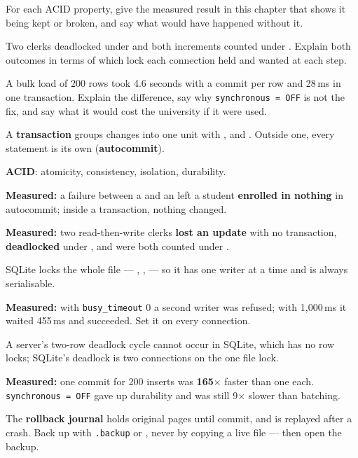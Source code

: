 \begin{checkpoint}
\begin{tightnum}
  \item For each ACID property, give the measured result in this chapter that
        shows it being kept or broken, and say what would have happened
        without it.
  \item Two clerks deadlocked under  and both increments
        counted under . Explain both outcomes in terms of
        which lock each connection held and wanted at each step.
  \item A bulk load of 200 rows took 4.6 seconds with a commit per row and
        28\,ms in one transaction. Explain the difference, say why
        \texttt{synchronous = OFF} is not the fix, and say what it would cost
        the university if it were used.
\end{tightnum}
\end{checkpoint}

\begin{chaptersummary}
\begin{tight}
  \item A \textbf{transaction} groups changes into one unit with
        ,  and . Outside one, every
        statement is its own (\textbf{autocommit}).
  \item \textbf{ACID}: atomicity, consistency, isolation, durability.
  \item \textbf{Measured:} a failure between a  and an
         left a student \textbf{enrolled in nothing} in
        autocommit; inside a transaction, nothing changed.
  \item \textbf{Measured:} two read-then-write clerks \textbf{lost an update}
        with no transaction, \textbf{deadlocked} under , and
        were both counted under .
  \item SQLite locks the whole file --- , ,
         --- so it has one writer at a time and is always
        serialisable.
  \item \textbf{Measured:} with \texttt{busy\_timeout} 0 a second writer was
        refused; with 1{,}000\,ms it waited 455\,ms and succeeded. Set it on
        every connection.
  \item A server's two-row deadlock cycle cannot occur in SQLite, which has no
        row locks; SQLite's deadlock is two connections on the one file lock.
  \item \textbf{Measured:} one commit for 200 inserts was \textbf{165$\times$}
        faster than one each. \texttt{synchronous = OFF} gave up durability and
        was still 9$\times$ slower than batching.
  \item The \textbf{rollback journal} holds original pages until commit, and is
        replayed after a crash. Back up with \texttt{.backup} or
        , never by copying a live file --- then open the
        backup.
\end{tight}
\end{chaptersummary}

